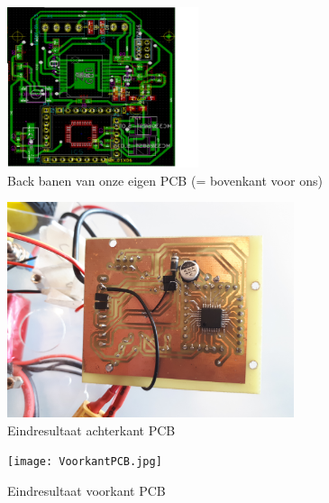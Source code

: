 \begin{figure}[h]
\centering
\includegraphics[width=0.5\textwidth]{Back.png}
\caption{Back banen van onze eigen PCB (= bovenkant voor ons)}
\label{fig:back}
\end{figure}

\begin{figure}[h]
\centering
\includegraphics[width=0.75\textwidth]{AchterkantPCB.jpg}
\caption{Eindresultaat achterkant PCB}
\label{fig:achterkantPCB}
\end{figure}

\begin{figure}[h]
\centering
\texttt{[image: VoorkantPCB.jpg]}
\caption{Eindresultaat voorkant PCB}
\label{fig:voorkantPCB}
\end{figure}
